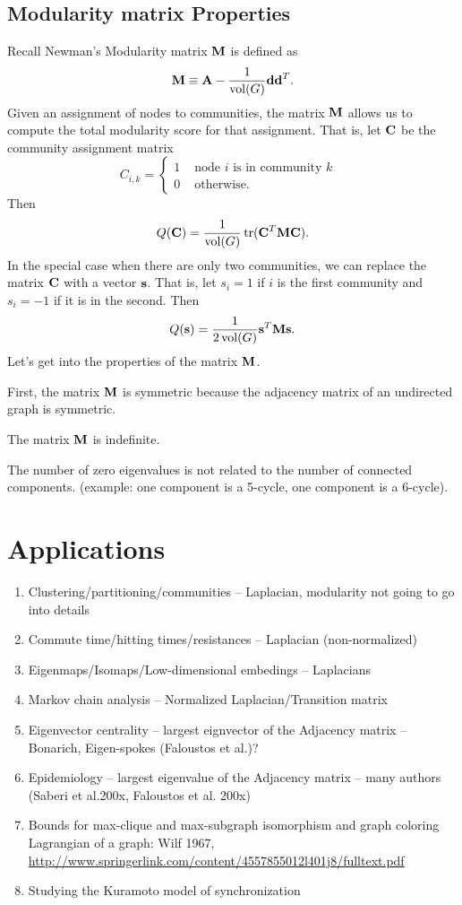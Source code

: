 \documentclass[nofonts]{dgleich-article}
\DeclareMathOperator{\trace}{tr}
\DeclareMathOperator{\vol}{vol}
\begin{document}
\subsection{Modularity matrix Properties}
Recall Newman's Modularity matrix $\boldsymbol{\mathrm{M}}$
is defined as 
\[ \mM \eqdef \mA - \frac{1}{\vol(G)} \vd \vd^T. \]
Given an assignment of nodes to communities, the matrix
$\boldsymbol{\mathrm{M}}$ allows us to compute the total modularity score 
for that assignment.  That is, 
let $\boldsymbol{\mathrm{C}}$ be the community assignment matrix 
\[ C_{i,k} = \begin{cases} 1 & \text{ node $i$ is in community $k$ } \\
                           0 & \text{ otherwise.}
             \end{cases}
\]
Then 
\[ Q(\mC) = \frac{1}{\vol(G)} \trace(\mC^T \mM \mC). \]
In the special case when there are only two communities, we
can replace the matrix $\boldsymbol{\mathrm{C}}$ with a vector $\boldsymbol{\mathrm{s}}$.  That is,
let $s_{i} = 1$ if $i$ is the first community and $s_{i} = -1$
if it is in the second.  Then 
\[ Q(\vs) = \frac{1}{2 \vol(G)} \vs^T \mM \vs. \]
Let's get into the properties of the matrix $\boldsymbol{\mathrm{M}}$.  

First, the matrix $\boldsymbol{\mathrm{M}}$ is symmetric because the adjacency
matrix of an undirected graph is symmetric.

The matrix $\boldsymbol{\mathrm{M}}$ is indefinite.

The number of zero eigenvalues is not related to the
number of connected components.
(example: one component is a 5-cycle, one component is a 6-cycle).  


\section{Applications}

\begin{enumerate}
\item Clustering/partitioning/communities -- Laplacian, modularity not going to go into details \cite{Fiedler1973-algebraic-connectivity,Shi2000-normalized-cuts,%
Newman2004-community}
\item Commute time/hitting times/resistances -- Laplacian (non-normalized)
\cite{Gobel1974-random-walks}
\item Eigenmaps/Isomaps/Low-dimensional embedings -- Laplacians
\item  Markov chain analysis -- Normalized Laplacian/Transition matrix
\cite{levin2008-markov}
\item  Eigenvector centrality -- largest eignvector of the Adjacency matrix -- Bonarich, Eigen-spokes (Faloustos et al.)?
\item  Epidemiology -- largest eigenvalue of the Adjacency matrix -- many authors
(Saberi et al.200x, Faloustos et al. 200x)
\item  Bounds for max-clique and max-subgraph isomorphism and graph coloring 
\cite{motzkin1965-turan}  Lagrangian of a graph: Wilf 1967,
\url{http://www.springerlink.com/content/4557855012l401j8/fulltext.pdf}
\item  Studying the Kuramoto model of synchronization \cite{arenas2008-synchronization}
\end{enumerate}
\end{document}
